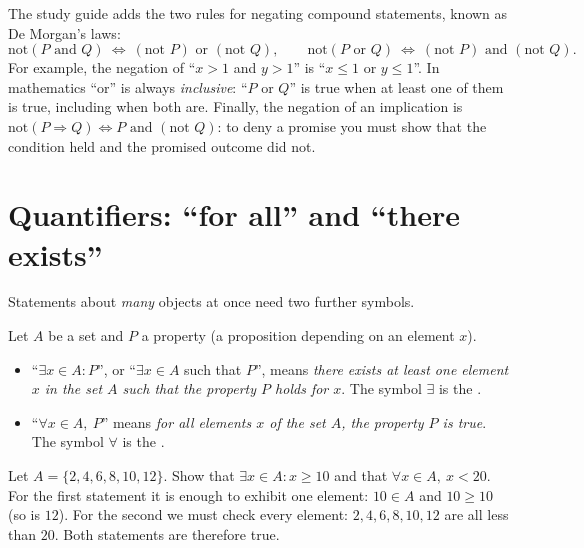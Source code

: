 \begin{external}
The study guide adds the two rules for negating compound statements, known as De Morgan's laws:
\[
\text{not}(P\text{ and }Q)\ \Leftrightarrow\ (\text{not }P)\text{ or }(\text{not }Q),\qquad
\text{not}(P\text{ or }Q)\ \Leftrightarrow\ (\text{not }P)\text{ and }(\text{not }Q).
\]
For example, the negation of ``$x>1$ and $y>1$'' is ``$x\le1$ or $y\le1$''. In mathematics ``or'' is
always \emph{inclusive}: ``$P$ or $Q$'' is true when at least one of them is true, including when both are.
Finally, the negation of an implication is
$\text{not}(P\Rightarrow Q)\Leftrightarrow P\text{ and }(\text{not }Q)$: to deny a promise you must show
that the condition held and the promised outcome did not.
\end{external}

\section{Quantifiers: ``for all'' and ``there exists''}\label{sec:quantifiers}

Statements about \emph{many} objects at once need two further symbols.

\begin{definition}
Let $A$ be a set and $P$ a property (a proposition depending on an element $x$).
\begin{itemize}
  \item ``$\exists x\in A: P$'', or ``$\exists x\in A$ such that $P$'', means \emph{there exists at least
  one element $x$ in the set $A$ such that the property $P$ holds for $x$}. The symbol $\exists$ is the
  .
  \item ``$\forall x\in A,\ P$'' means \emph{for all elements $x$ of the set $A$, the property $P$ is
  true}. The symbol $\forall$ is the .
\end{itemize}
\end{definition}

\begin{example}\label{ex:quant-finite}
Let $A=\{2,4,6,8,10,12\}$. Show that $\exists x\in A: x\ge 10$ and that $\forall x\in A,\ x<20$.
\solution
For the first statement it is enough to exhibit one element: $10\in A$ and $10\ge10$ (so is $12$). For
the second we must check every element: $2,4,6,8,10,12$ are all less than $20$. Both statements are
therefore true. 
\end{example}

